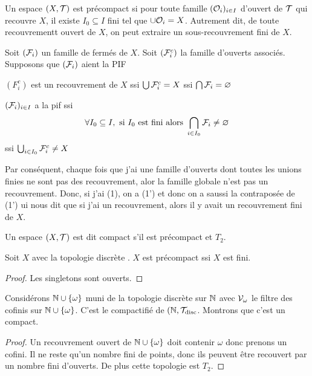 \begin{exercice}
    Un espace $(X,\mathcal{T})$ est précompact si pour toute famille $(\mathcal{O}_i)_{i\in I}$ d'ouvert de $\mathcal{T}$ qui recouvre $X$, il existe $I_0\subseteq I$ fini tel que $\cup \mathcal{O}_i =X$. Autrement dit, de toute recouvrementt ouvert de $X$, on peut extraire un sous-recouvrement fini de $X$.
\end{exercice}
\begin{lemme}
    Soit $(\mathcal{F}_i)$ un famille de fermés de $X$. Soit $(\mathcal{F}^c_i)$ la famille d'ouverts associés. Supposons que $(\mathcal{F}_i)$ aient la PIF
\end{lemme}
\begin{remarque}
    $(F_i^c)$ est un recouvrement de $X$ ssi $\bigcup\mathcal{F}_i^c = X$ ssi $\bigcap \mathcal{F}_i = \varnothing$
\end{remarque}
\begin{remarque}
    $(\mathcal{F}_i)_{i\in I}$ a la pif ssi $$\forall  I_0\subseteq I, \text{ si $I_0$ est fini alors }\bigcap_{i\in I_0}\mathcal{F}_i\ne\varnothing$$ ssi $\bigcup_{i\in I_0}\mathcal{F}_i^c\ne X$
\end{remarque}
Par conséquent, chaque fois que j'ai une famille d'ouverts dont toutes les unions finies ne sont pas des recouvrement, alor la famille globale n'est pas un recouvrement. Donc, si j'ai (1), on a (1') et donc on a saussi la contraposée de (1') ui nous dit que si j'ai un recouvrement, alors il y avait un recouvrement fini de $X$. 
\begin{definition}
    Un espace $(X,\mathcal{T})$ est dit compact s'il est précompact et $T_2$.
\end{definition}
 \begin{exemple}
     Soit $X$ avec la topologie discrète . $X$ est précompact ssi $X$ est fini.
 \end{exemple}
 \begin{proof}
     Les singletons sont ouverts.
 \end{proof}
 \begin{exemple}
     Considérons $\mathbb{N}\cup\{\omega\}$ muni de la topologie discrète sur $\mathbb{N}$ avec $\mathcal{V}_\omega$ le filtre des cofinis sur $\mathbb{N}\cup\{\omega\}$. C'est le compactifié de $(\mathbb{N},\mathcal{T}_\text{disc}$. Montrons que c'est un compact.
 \end{exemple}
 \begin{proof}
     Un recouvrement ouvert de $\mathbb{N}\cup\{\omega\}$ doit contenir $\omega$ donc prenons un cofini. Il ne reste qu'un nombre fini de points, donc ils peuvent être recouvert par un nombre fini d'ouverts. De plus cette topologie est $T_2$.
 \end{proof}
